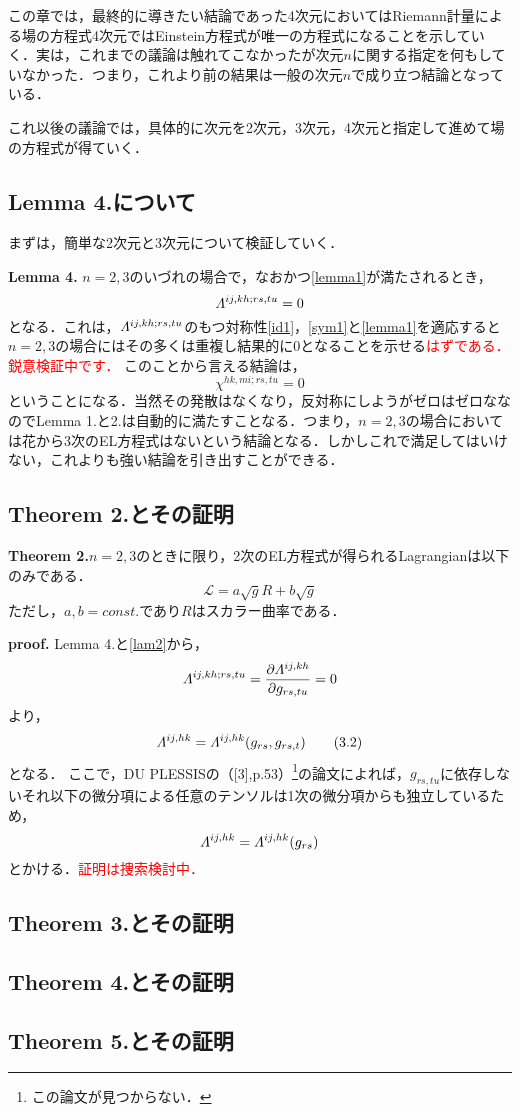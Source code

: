 \documentclass[main]{subfiles}
\begin{document}
この章では，最終的に導きたい結論であった4次元においてはRiemann計量による場の方程式4次元ではEinstein方程式が唯一の方程式になることを示していく．実は，これまでの議論は触れてこなかったが次元\(n\)に関する指定を何もしていなかった．つまり，これより前の結果は一般の次元\(n\)で成り立つ結論となっている．

これ以後の議論では，具体的に次元を2次元，3次元，4次元と指定して進めて場の方程式が得ていく．
\subsection{Lemma 4.について}
まずは，簡単な2次元と3次元について検証していく．

\textbf{Lemma 4.}
\(n=2,3\)のいづれの場合で，なおかつ\eqref{lemma1}が満たされるとき，
\begin{equation*}
    \varLambda^{ij,kh;rs,tu}=0
\end{equation*}
となる．これは，\(\varLambda^{ij,kh;rs,tu}\)のもつ対称性\eqref{id1}，\eqref{sym1}と\eqref{lemma1}を適応すると\(n=2,3\)の場合にはその多くは重複し結果的に0となることを示せる\textcolor{red}{はずである．鋭意検証中です．}
このことから言える結論は，
\begin{equation*}
    \chi ^{hk,mi;rs,tu}=0
\end{equation*}
ということになる．当然その発散はなくなり，反対称にしようがゼロはゼロななのでLemma 1.と2.は自動的に満たすことなる．つまり，\(n=2,3\)の場合においては花から3次のEL方程式はないという結論となる．しかしこれで満足してはいけない，これよりも強い結論を引き出すことができる．
\subsection{Theorem 2.とその証明}
\textbf{Theorem 2.}\(n=2,3\)のときに限り，2次のEL方程式が得られるLagrangianは以下のみである．
\begin{equation*}
    \mathscr{L} = a\sqrt{g}R + b\sqrt{g}
    \tag{3.1}\label{seclag}
\end{equation*}
ただし，\(a,b=const.\)であり\(R\)はスカラー曲率である．

\textbf{proof.}
Lemma 4.と\eqref{lam2}から，
\begin{equation*}
    \varLambda^{ij,kh;rs,tu}= \dfrac{\partial \varLambda^{ij,kh}}{\partial g_{rs,tu} } =0
\end{equation*}
より，
\begin{equation*}
    \varLambda^{ij,hk} = \varLambda^{ij,hk}(g_{rs},g_{rs,t})
    \tag{3.2}\label{3.2}
\end{equation*}
となる．
ここで，DU PLESSISの（[3],p.53）\footnote{この論文が見つからない．}の論文によれば，\(g_{rs,tu}\)に依存しないそれ以下の微分項による任意のテンソルは1次の微分項からも独立しているため，
\begin{equation*}
    \varLambda^{ij,hk} = \varLambda^{ij,hk}(g_{rs})
\end{equation*}
とかける．\textcolor{red}{証明は捜索検討中．}


\subsection{Theorem 3.とその証明}

\subsection{Theorem 4.とその証明}

\subsection{Theorem 5.とその証明}
\end{document}
